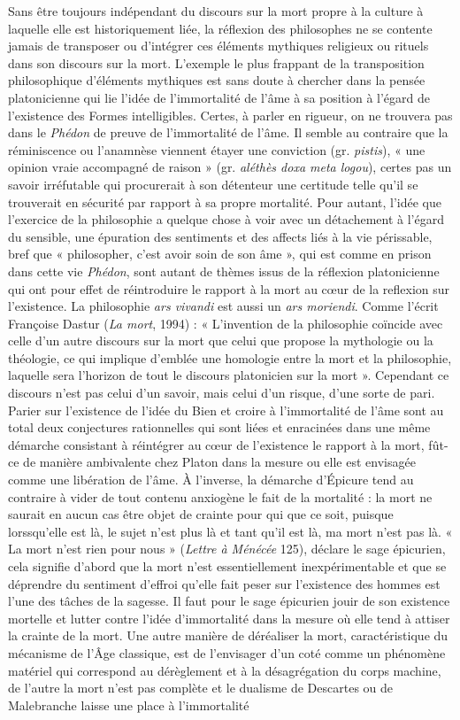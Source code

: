 Sans être toujours indépendant du discours sur la mort propre à la culture à laquelle elle est historiquement liée, la réflexion des philosophes ne se contente jamais de transposer ou d'intégrer ces éléments mythiques religieux ou rituels dans son discours sur la mort. L'exemple le plus frappant de la transposition philosophique d'éléments mythiques est sans doute à chercher dans la pensée platonicienne qui lie l'idée de l'immortalité de l'âme à sa position à l'égard de l'existence des Formes intelligibles. Certes, à parler en rigueur, on ne trouvera pas dans le {\it Phédon} de preuve de l'immortalité de l'âme. Il semble au contraire que la réminiscence ou l'anamnèse viennent étayer une conviction (gr. {\it pistis}), « une opinion vraie accompagné de raison » (gr. {\it aléthès doxa meta logou}), certes pas un savoir irréfutable qui procurerait à son détenteur une certitude telle qu'il se trouverait en sécurité par rapport à sa propre mortalité. Pour autant, l'idée que l'exercice de la philosophie a quelque chose à voir avec un détachement à l'égard du sensible, une épuration des sentiments et des affects liés à la vie périssable, bref que « philosopher, c'est avoir soin de son âme », qui est comme en prison dans cette vie {\it Phédon}, sont autant de thèmes issus de la réflexion platonicienne qui ont pour effet de réintroduire le rapport à la mort au c{\oe}ur de la reflexion sur l'existence. La philosophie {\it ars vivandi} est aussi un {\it ars moriendi}. Comme l'écrit Françoise Dastur ({\it La mort}, 1994) : « L'invention de la philosophie coïncide avec celle d'un autre discours sur la mort que celui que propose la mythologie ou la théologie, ce qui implique d'emblée une homologie entre la mort et la philosophie, laquelle sera l'horizon de tout le discours platonicien sur la mort ». Cependant ce discours n'est pas celui d'un savoir, mais celui d'un risque, d'une sorte de pari. Parier sur l'existence de l'idée du Bien et croire à l'immortalité de l'âme sont au total deux conjectures rationnelles qui sont liées et enracinées dans une même démarche consistant à réintégrer au c{\oe}ur de l'existence le rapport à la mort, fût-ce de manière ambivalente chez Platon dans la mesure ou elle est envisagée comme une libération de l'âme. À l'inverse, la démarche d'Épicure tend au contraire à vider de tout contenu anxiogène le fait de la mortalité : la mort ne saurait en aucun cas être objet de crainte pour qui que ce soit, puisque lorssqu'elle est là, le sujet n'est plus là et tant qu'il est là, ma mort n'est pas là. « La mort n'est rien pour nous » ({\it Lettre à Ménécée} 125), déclare le sage épicurien, cela signifie d'abord que la mort n'est essentiellement inexpérimentable et que se déprendre du sentiment d'effroi qu'elle fait peser sur l'existence des hommes est l'une des tâches de la sagesse. Il faut pour le sage épicurien jouir de son existence mortelle et lutter contre l'idée d'immortalité dans la mesure où elle tend à attiser la crainte de la mort. Une autre manière de déréaliser la mort, caractéristique du mécanisme de l'Âge classique, est de l'envisager d'un coté comme un phénomène matériel qui correspond au dérèglement et à la désagrégation du corps machine, de l'autre la mort n'est pas complète et le dualisme de Descartes ou de Malebranche laisse une place à l'immortalité 
